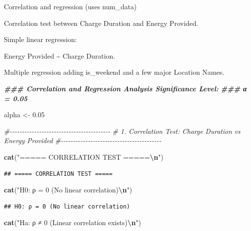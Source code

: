 \documentclass[
  12pt,
]{article}
\newenvironment{Shaded}{\begin{snugshade}}{\end{snugshade}}
\newcommand{\CommentTok}[1]{\textcolor[rgb]{0.56,0.35,0.01}{\textit{#1}}}
\newcommand{\DocumentationTok}[1]{\textcolor[rgb]{0.56,0.35,0.01}{\textbf{\textit{#1}}}}
\newcommand{\FloatTok}[1]{\textcolor[rgb]{0.00,0.00,0.81}{#1}}
\newcommand{\FunctionTok}[1]{\textcolor[rgb]{0.13,0.29,0.53}{\textbf{#1}}}
\newcommand{\NormalTok}[1]{#1}
\newcommand{\OtherTok}[1]{\textcolor[rgb]{0.56,0.35,0.01}{#1}}
\newcommand{\SpecialCharTok}[1]{\textcolor[rgb]{0.81,0.36,0.00}{\textbf{#1}}}
\newcommand{\StringTok}[1]{\textcolor[rgb]{0.31,0.60,0.02}{#1}}
\begin{document}
Correlation and regression (uses num\_data)

Correlation test between Charge Duration and Energy Provided.

Simple linear regression:

Energy Provided \textasciitilde{} Charge Duration.

Multiple regression adding is\_weekend and a few major Location Names.

\begin{Shaded}
\begin{Highlighting}[]
\DocumentationTok{\#\#\# Correlation and Regression Analysis Significance Level:}
\DocumentationTok{\#\#\# α = 0.05}

\NormalTok{alpha }\OtherTok{\textless{}{-}} \FloatTok{0.05}

\CommentTok{\#{-}{-}{-}{-}{-}{-}{-}{-}{-}{-}{-}{-}{-}{-}{-}{-}{-}{-}{-}{-}{-}{-}{-}{-}{-}{-}{-}{-}{-}{-}{-}{-}{-}{-}{-}{-}{-}{-}{-}{-}{-}}
\CommentTok{\# 1. Correlation Test: Charge Duration vs Energy Provided}
\CommentTok{\#{-}{-}{-}{-}{-}{-}{-}{-}{-}{-}{-}{-}{-}{-}{-}{-}{-}{-}{-}{-}{-}{-}{-}{-}{-}{-}{-}{-}{-}{-}{-}{-}{-}{-}{-}{-}{-}{-}{-}{-}{-}}

\FunctionTok{cat}\NormalTok{(}\StringTok{"===== CORRELATION TEST =====}\SpecialCharTok{\textbackslash{}n}\StringTok{"}\NormalTok{)}
\end{Highlighting}
\end{Shaded}

\begin{verbatim}
## ===== CORRELATION TEST =====
\end{verbatim}

\begin{Shaded}
\begin{Highlighting}[]
\FunctionTok{cat}\NormalTok{(}\StringTok{"H0: ρ = 0 (No linear correlation)}\SpecialCharTok{\textbackslash{}n}\StringTok{"}\NormalTok{)}
\end{Highlighting}
\end{Shaded}

\begin{verbatim}
## H0: ρ = 0 (No linear correlation)
\end{verbatim}

\begin{Shaded}
\begin{Highlighting}[]
\FunctionTok{cat}\NormalTok{(}\StringTok{"Ha: ρ ≠ 0 (Linear correlation exists)}\SpecialCharTok{\textbackslash{}n}\StringTok{"}\NormalTok{)}
\end{Highlighting}
\end{Shaded}
\end{document}
